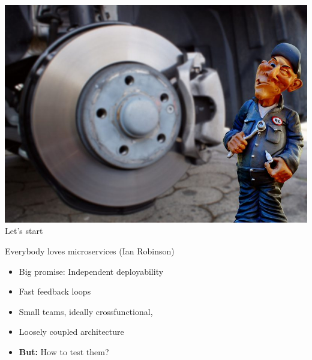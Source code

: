 
\begin{frame}
    \centering\includegraphics[width=.8\textwidth]{./assets/titelbild.jpg}
    \newline
    \huge{Let's start}
\end{frame}

\begin{frame}{Everybody loves microservices}
(Ian Robinson)
    \begin{itemize}
        \item Big promise: Independent deployability
        \item Fast feedback loops
        \item Small teams, ideally crossfunctional,
        \item Loosely coupled architecture
        \item \textbf{But:} How to test them?
    \end{itemize}
\end{frame}
